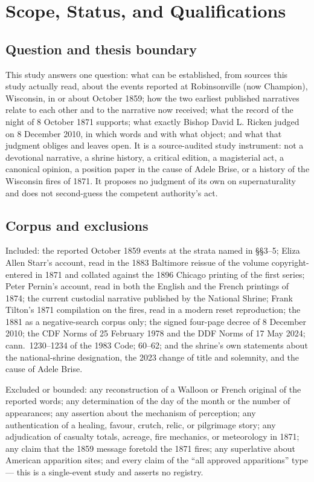 \sectionguard
\section{Scope, Status, and Qualifications}

\subsection*{Question and thesis boundary}

This study answers one question: what can be established, from sources
this study actually read, about the events reported at Robinsonville
(now Champion), Wisconsin, in or about October 1859; how the two
earliest published narratives relate to each other and to the narrative
now received; what the record of the night of 8 October 1871 supports;
what exactly Bishop David L. Ricken judged on 8 December 2010, in which
words and with what object; and what that judgment obliges and leaves
open. It is a source-audited study instrument: not a devotional
narrative, a shrine history, a critical edition, a magisterial act, a
canonical opinion, a position paper in the cause of Adele Brise, or a
history of the Wisconsin fires of 1871. It proposes no judgment of its
own on supernaturality and does not second-guess the competent
authority's act.

\subsection*{Corpus and exclusions}

Included: the reported October 1859 events at the strata named in
\S\S3--5; Eliza Allen Starr's account, read in the 1883 Baltimore
reissue of the volume copyright-entered in 1871 and collated against
the 1896 Chicago printing of the first series; Peter Pernin's account,
read in both the English and the French printings of 1874; the current
custodial narrative published by the National Shrine; Frank Tilton's
1871 compilation on the fires, read in a modern reset reproduction; the
1881  as a negative-search corpus
only; the signed four-page decree of 8 December 2010; the CDF Norms of
25 February 1978 and the DDF Norms of 17 May 2024; cann.~1230--1234 of
the 1983 Code;  60--62; and the shrine's own
statements about the national-shrine designation, the 2023 change of
title and solemnity, and the cause of Adele Brise.

Excluded or bounded: any reconstruction of a Walloon or French original
of the reported words; any determination of the day of the month or the
number of appearances; any assertion about the mechanism of perception;
any authentication of a healing, favour, crutch, relic, or pilgrimage
story; any adjudication of casualty totals, acreage, fire mechanics, or
meteorology in 1871; any claim that the 1859 message foretold the 1871
fires; any superlative about American apparition sites; and every claim
of the ``all approved apparitions'' type --- this is a single-event
study and asserts no registry.

